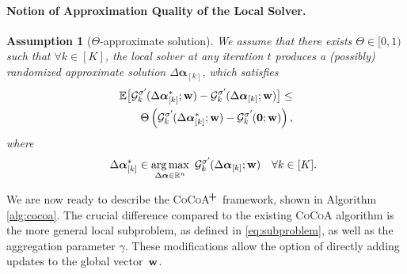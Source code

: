 \documentclass{article}
\newcommand{\cocoa}{\textsc{CoCoA}\xspace}
\newcommand{\cocoap}{\textsc{CoCoA$\!^{\bf \textbf{\footnotesize+}}$}\xspace}
\newcommand{\Exp}{\mathbb{E}}                      %
\DeclareMathOperator*{\argmax}{arg\,max}
\newcommand{\R}{\mathbb{R}}                      %
\newcommand{\wv}{ {\bf w}}
\newcommand{\alphav}{ {\boldsymbol \alpha}}
\newcommand{\0}{ {\bf 0}}
\newcommand{\vsubset}[2]{#1_{[#2]}}
\newcommand{\Ggk}{\mathcal{G}^{\sigma'}_k\hspace{-0.08em}}
\theoremstyle{plain}
\newtheorem{assumption}{Assumption}
\theoremstyle{definition}
\begin{document}
\paragraph{Notion of Approximation Quality of the Local Solver.}

\begin{assumption}[$\Theta$-approximate solution]
\label{asm:THeta}
We assume that 
there exists $\Theta \in [0,1)$ such that 
$\forall k\in [K]$, 
the local solver at any iteration $t$ produces
a (possibly) randomized approximate solution $\vsubset{\Delta \alphav}{k}$,
which satisfies
\begin{align}
\label{eq:localSolutionQuality}
\Exp\big[
 \Ggk(\vsubset{\Delta \alphav^*}{k};\wv)
-
 \Ggk(\vsubset{\Delta \alphav}{k};\wv)
\big] 
\leq 
\\ \qquad \nonumber \Theta
\left(
 \Ggk(\vsubset{\Delta \alphav^*}{k};\wv)
 -
 \Ggk({\bf 0};\wv)
 \right),
\end{align}
where\vspace{-2mm}
\begin{align}
\label{eq:asjfcowjfcaw}
\vsubset{\Delta \alphav^*}{k}
\in \argmax_{\Delta \alphav \in \R^n} \ 
 \Ggk(\vsubset{\Delta \alphav}{k};\wv) \quad \forall k\in[K]. %
 \hspace{-5mm}\vspace{-1mm}
\end{align}

\end{assumption} 
We are now ready to describe the \cocoap framework, shown in Algorithm \ref{alg:cocoa}.
The crucial difference compared to the existing \cocoa algorithm \cite{jaggi2014communication} is the more general local subproblem,  as defined in \eqref{eq:subproblem}, as well as the aggregation parameter $\gamma$. 
These modifications allow the option of directly adding updates to the global vector~$\wv$.
\end{document}
